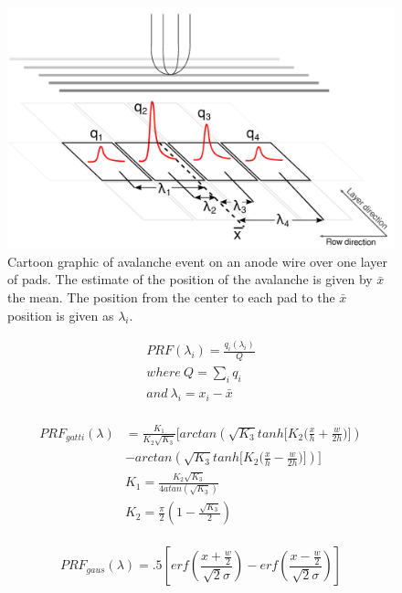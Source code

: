 \documentclass[review]{elsarticle}
\begin{document}
\begin{figure}[H]
\includegraphics[width=\linewidth]{defofavalanche}
\caption{Cartoon graphic of avalanche event on an anode wire over one layer of pads. The estimate of the position of the avalanche is given by $\bar{x}$  the mean. The position from the center to each pad to the $\bar{x}$ position is given as $\lambda_i$.}
\label{fig:av}
\end{figure}

\begin{equation}\label{eq:1}
\begin{split}
PRF(\lambda_i) = \frac{q_i(\lambda_i)}{Q}\\
where \ Q=\sum_i q_i\\
and \   \lambda_i=x_i-\bar{x}\\
\end{split}
\end{equation}

\begin{equation}\label{eq:gatti}
\begin{split}
PRF_{gatti}(\lambda)
& = \frac{K_{1}}{K_{2}\sqrt{K_{3}}}\bigl[arctan(\sqrt{K_{3}}tanh\bigl[K_{2}\bigl(\frac{x}{h}+\frac{w}{2h}\bigr)\bigr]) \\
& - arctan(\sqrt{K_{3}}tanh\bigl[K_{2}\bigl(\frac{x}{h}-\frac{w}{2h}\bigr)\bigr])\bigr] \\
& K_{1} = \frac{K_{2}\sqrt{K_3}}{4 atan(\sqrt{K_3})}\\
& K_2 = \frac{\pi}{2}\left(1-\frac{\sqrt{K_{3}}}{2}\right)\\
\end{split}
\end{equation}

\begin{equation}\label{eq:gaus}
PRF_{gaus}(\lambda) = .5\left[erf\left(\frac{x+\frac{w}{2}}{\sqrt{2}\sigma}\right) - erf\left(\frac{x-\frac{w}{2}}{\sqrt{2}\sigma}\right) \right]
\end{equation}
\end{document}
